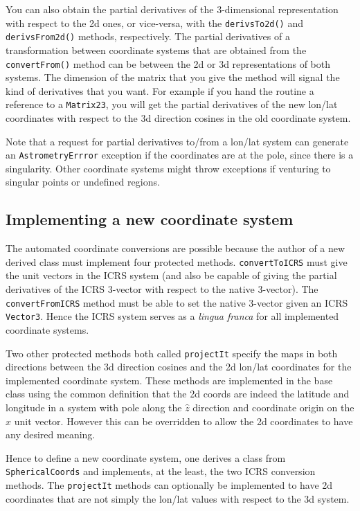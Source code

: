 \documentclass[11pt,preprint,flushrt]{aastex}
\begin{document}
You can also obtain the partial derivatives of the 3-dimensional representation with respect to the 2d ones, or vice-versa, with the {\tt derivsTo2d()} and {\tt derivsFrom2d()} methods, respectively.  The partial derivatives of a transformation between coordinate systems that are obtained from the {\tt convertFrom()} method can be between the 2d or 3d representations of both systems.  The dimension of the matrix that you give the method will signal the kind of derivatives that you want.  For example if you hand the routine a reference to a {\tt Matrix23}, you will get the partial derivatives of the new lon/lat coordinates with respect to the 3d direction cosines in the old coordinate system.

Note that a request for partial derivatives to/from a lon/lat system can generate an {\tt AstrometryErrror} exception if the coordinates are at the pole, since there is a singularity.  Other coordinate systems might throw exceptions if venturing to singular points or undefined regions.

\subsection{Implementing a new coordinate system}
The automated coordinate conversions are possible because the author of a new derived class must implement four protected methods.  {\tt convertToICRS} must give the unit vectors in the ICRS system (and also be capable of giving the partial derivatives of the ICRS 3-vector with respect to the native 3-vector).   The {\tt convertFromICRS} method must be able to set the native 3-vector given an ICRS {\tt Vector3}.  Hence the ICRS system serves as a {\it lingua franca} for all implemented coordinate systems.

Two other protected methods both called {\tt projectIt} specify the maps in both directions between the 3d direction cosines and the 2d lon/lat coordinates for the implemented coordinate system.  These methods are implemented in the base class using the common definition that the 2d coords are indeed the latitude and longitude in a system with pole along the $\hat z$ direction and coordinate origin on the $\hat x$ unit vector.  However this can be overridden to allow the 2d coordinates to have any desired meaning.

Hence to define a new coordinate system, one derives a class from {\tt SphericalCoords} and implements, at the least, the two ICRS conversion methods.  The {\tt projectIt} methods can optionally be implemented to have 2d coordinates that are not simply the lon/lat values with respect to the 3d system.
\end{document}
